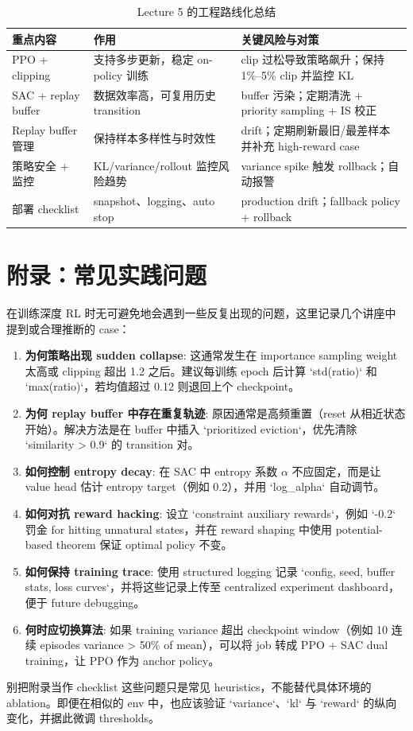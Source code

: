 \documentclass[a4paper]{article}
\begin{document}
\begin{table}[H]
\centering
\begin{tabular}{p{} p{} p{}}
\toprule
重点内容 & 作用 & 关键风险与对策 \\
\midrule
PPO + clipping & 支持多步更新，稳定 on-policy 训练 & clip 过松导致策略飙升；保持 1\%--5\% clip 并监控 KL \\
SAC + replay buffer & 数据效率高，可复用历史 transition & buffer 污染；定期清洗 + priority sampling + IS 校正 \\
Replay buffer 管理 & 保持样本多样性与时效性 & drift；定期刷新最旧/最差样本并补充 high-reward case \\
策略安全 + 监控 & KL/variance/rollout 监控风险趋势 & variance spike 触发 rollback；自动报警 \\
部署 checklist & snapshot、logging、auto stop & production drift；fallback policy + rollback \\
\bottomrule
\end{tabular}
\caption{Lecture 5 的工程路线化总结}
\end{table}

\section{附录：常见实践问题}

在训练深度 RL 时无可避免地会遇到一些反复出现的问题，这里记录几个讲座中提到或合理推断的 case：

\begin{enumerate}
    \item \textbf{为何策略出现 sudden collapse}: 这通常发生在 importance sampling weight 太高或 clipping 超出 1.2 之后。建议每训练 epoch 后计算 `std(ratio)` 和 `max(ratio)`，若均值超过 0.12 则退回上个 checkpoint。
    \item \textbf{为何 replay buffer 中存在重复轨迹}: 原因通常是高频重置（reset 从相近状态开始）。解决方法是在 buffer 中插入 `prioritized eviction`，优先清除 `similarity > 0.9` 的 transition 对。
    \item \textbf{如何控制 entropy decay}: 在 SAC 中 entropy 系数 $\alpha$ 不应固定，而是让 value head 估计 entropy target（例如 0.2），并用 `log_alpha` 自动调节。
    \item \textbf{如何对抗 reward hacking}: 设立 `constraint auxiliary rewards`，例如 `-0.2` 罚金 for hitting unnatural states，并在 reward shaping 中使用 potential-based theorem 保证 optimal policy 不变。
    \item \textbf{如何保持 training trace}: 使用 structured logging 记录 `config, seed, buffer stats, loss curves`，并将这些记录上传至 centralized experiment dashboard，便于 future debugging。
    \item \textbf{何时应切换算法}: 如果 training variance 超出 checkpoint window（例如 10 连续 episodes variance > 50\% of mean），可以将 job 转成 PPO + SAC dual training，让 PPO 作为 anchor policy。
\end{enumerate}

\begin{warningbox}{别把附录当作 checklist}
这些问题只是常见 heuristics，不能替代具体环境的 ablation。即便在相似的 env 中，也应该验证 `variance`、`kl` 与 `reward` 的纵向变化，并据此微调 thresholds。
\end{warningbox}
\end{document}
